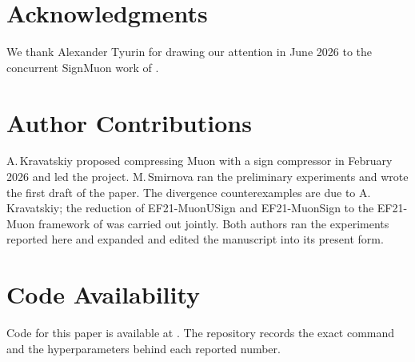 %
%
%

\section*{Acknowledgments}

We thank Alexander Tyurin for drawing our attention in June 2026 to the concurrent
SignMuon work of \citet{mishra2026signmuon}.

\section*{Author Contributions}

A.\,Kravatskiy proposed compressing Muon with a sign compressor in February
2026 and led the project. M.\,Smirnova ran the preliminary experiments and
wrote the first draft of the paper. The divergence counterexamples are due to
A.\,Kravatskiy; the reduction of EF21-MuonUSign and EF21-MuonSign to the
EF21-Muon framework of \citet{gruntkowska2025error} was carried out jointly.
Both authors ran the experiments reported here and expanded and edited the
manuscript into its present form.

\section*{Code Availability}

Code for this paper is available at \arxivrepo. The repository records the exact command and the
hyperparameters behind each reported number.
